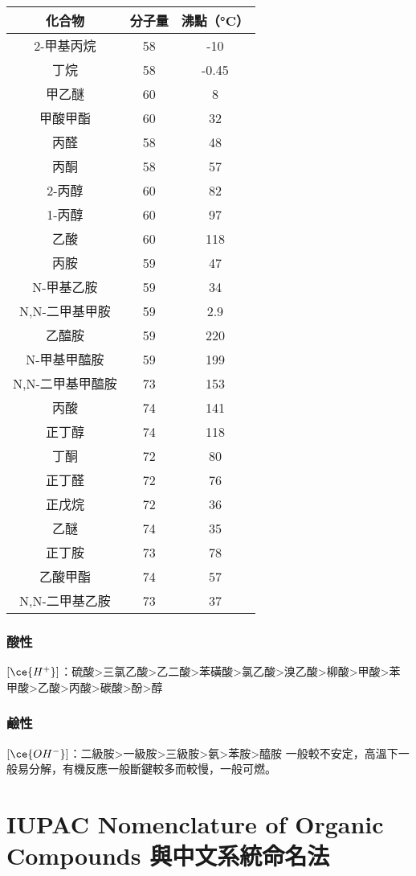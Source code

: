 \documentclass[a4paper,12pt]{report}
\begin{document}
\begin{longtable}[c]{|c|c|c|}
\hline
化合物 & 分子量 & 沸點（°C）\\\hline\endhead
2-甲基丙烷 & 58 & -10\\\hline
丁烷 & 58 & -0.45\\\hline
甲乙醚 & 60 & 8\\\hline
甲酸甲酯 & 60 & 32\\\hline
丙醛 & 58 & 48\\\hline
丙酮 & 58 & 57\\\hline
2-丙醇 & 60 & 82\\\hline
1-丙醇 & 60 & 97\\\hline
乙酸 & 60 & 118\\\hline
丙胺 & 59 & 47\\\hline
N-甲基乙胺 & 59 & 34\\\hline
N,N-二甲基甲胺 & 59 & 2.9\\\hline
乙醯胺 & 59 & 220\\\hline
N-甲基甲醯胺 & 59 & 199\\\hline
N,N-二甲基甲醯胺 & 73 & 153\\\hline
丙酸 & 74 & 141\\\hline
正丁醇 & 74 & 118\\\hline
丁酮 & 72 & 80\\\hline
正丁醛 & 72 & 76\\\hline
正戊烷 & 72 & 36\\\hline
乙醚 & 74 & 35\\\hline
正丁胺 & 73 & 78\\\hline
乙酸甲酯 & 74 & 57\\\hline
N,N-二甲基乙胺 & 73 & 37\\\hline
\end{longtable}\FB
\subsubsection{酸性}
$[\ce{H^+}]$：硫酸>三氯乙酸>乙二酸>苯磺酸>氯乙酸>溴乙酸>柳酸>甲酸>苯甲酸>乙酸>丙酸>碳酸>酚>醇
\subsubsection{鹼性}
$[\ce{OH^-}]$：二級胺>一級胺>三級胺>氨>苯胺>醯胺
一般較不安定，高溫下一般易分解，有機反應一般斷鍵較多而較慢，一般可燃。


\section{IUPAC Nomenclature of Organic Compounds 與中文系統命名法}
\end{document}
